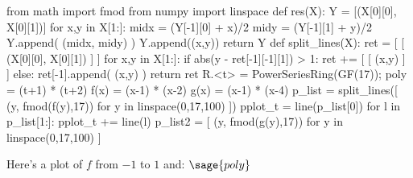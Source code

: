 \begin{sagesilent}
  from math import fmod
  from numpy import linspace
  def res(X):
    Y = [(X[0][0], X[0][1])]
    for x,y in X[1:]:
      midx = (Y[-1][0] + x)/2
      midy = (Y[-1][1] + y)/2
      Y.append( (midx, midy) )
      Y.append((x,y))
    return Y
  def split_lines(X):
    ret = [ [ (X[0][0], X[0][1])  ] ]
    for x,y in X[1:]:
      if abs(y - ret[-1][-1][1]) > 1:
        ret +=  [ [ (x,y) ] ] 
      else:
        ret[-1].append( (x,y) )
    return ret 
  R.<t> = PowerSeriesRing(GF(17));
  poly = (t+1) * (t+2)
  f(x) = (x-1) * (x-2)
  g(x) = (x-1) * (x-4)
  p_list =  split_lines([ (y, fmod(f(y),17)) for y in linspace(0,17,100) ])
  pplot_t =  line(p_list[0]) 
  for l in p_list[1:]:
    pplot_t += line(l) 
  p_list2 = [ (y, fmod(g(y),17)) for y in linspace(0,17,100) ]
\end{sagesilent}
Here's a plot of $f$ from $-1$ to $1$ and:  $\sage{poly}$ %
\begin{center}
\end{center}
